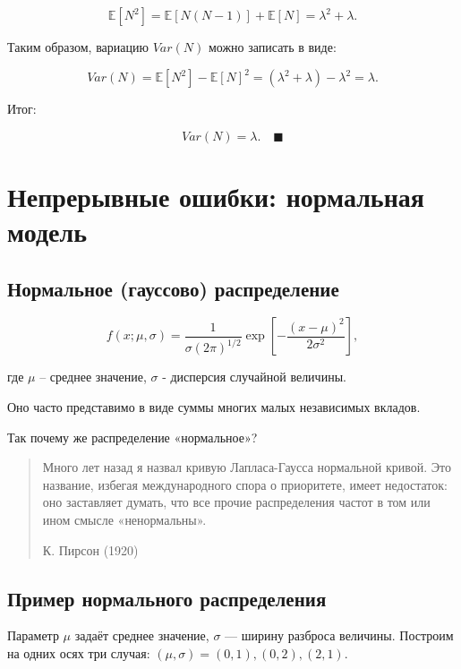 \documentclass[
  russian,
  letterpaper,
]{scrbook}
\begin{document}
\[\mathbb{E}[N^2]=\mathbb{E}[N(N-1)]+\mathbb{E}[N]=\lambda^2+\lambda.\]

Таким образом, вариацию \(Var(N)\) можно записать в виде:

\[Var(N)=\mathbb{E}[N^2]-\mathbb{E}[N]^2=(\lambda^2+\lambda)-\lambda^2=\lambda.\]

Итог:

\[Var(N)=\lambda. \quad \blacksquare\]

\section{Непрерывные ошибки: нормальная
модель}\label{ux43dux435ux43fux440ux435ux440ux44bux432ux43dux44bux435-ux43eux448ux438ux431ux43aux438-ux43dux43eux440ux43cux430ux43bux44cux43dux430ux44f-ux43cux43eux434ux435ux43bux44c}

\subsection{Нормальное (гауссово)
распределение}\label{ux43dux43eux440ux43cux430ux43bux44cux43dux43eux435-ux433ux430ux443ux441ux441ux43eux432ux43e-ux440ux430ux441ux43fux440ux435ux434ux435ux43bux435ux43dux438ux435}

\[f(x;\mu,\sigma)=\frac{1}{\sigma (2\pi)^{1/2}}\exp\left[-\frac{(x-\mu)^2}{2\sigma^2}\right],\]

где \(\mu\) -- среднее значение, \(\sigma\) - дисперсия случайной
величины.

Оно часто представимо в виде суммы многих малых независимых вкладов.

Так почему же распределение «нормальное»?

\begin{quote}
Много лет назад я назвал кривую Лапласа-Гаусса нормальной кривой. Это
название, избегая международного спора о приоритете, имеет недостаток:
оно заставляет думать, что все прочие распределения частот в том или
ином смысле «ненормальны».

К. Пирсон (1920)
\end{quote}

\subsection{Пример нормального
распределения}\label{ux43fux440ux438ux43cux435ux440-ux43dux43eux440ux43cux430ux43bux44cux43dux43eux433ux43e-ux440ux430ux441ux43fux440ux435ux434ux435ux43bux435ux43dux438ux44f}

Параметр \(\mu\) задаёт среднее значение, \(\sigma\) --- ширину разброса
величины. Построим на одних осях три случая:
\((\mu,\sigma)=(0,1),(0,2),(2,1)\).
\end{document}
